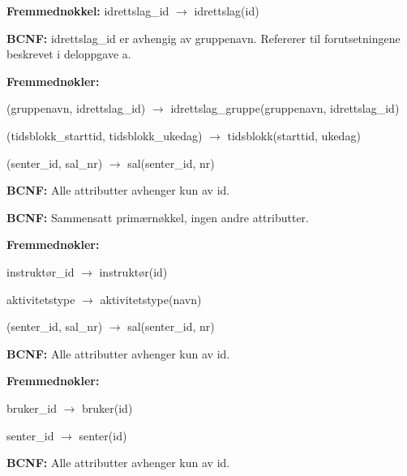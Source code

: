 \vspace{0.8em}
\textbf{Fremmednøkkel:} idrettslag\_id $\rightarrow$ idrettslag(id)\par
\vspace{0.15em}
\textbf{BCNF:} idrettslag\_id er avhengig av gruppenavn. Refererer til forutsetningene beskrevet i deloppgave a.

\vspace{0.8em}
\textbf{Fremmednøkler:}\par\vspace{-0.55em}
\begin{schemafks}
    \item (gruppenavn, idrettslag\_id) $\rightarrow$ idrettslag\_gruppe(gruppenavn, idrettslag\_id)
    \item (tidsblokk\_starttid, tidsblokk\_ukedag) $\rightarrow$ tidsblokk(starttid, ukedag)
    \item (senter\_id, sal\_nr) $\rightarrow$ sal(senter\_id, nr)
\end{schemafks}
\vspace{-0.2em}
\textbf{BCNF:} Alle attributter avhenger kun av id.

\vspace{0.8em}
\textbf{BCNF:} Sammensatt primærnøkkel, ingen andre attributter.

\vspace{0.8em}
\textbf{Fremmednøkler:}\par\vspace{-0.55em}
\begin{schemafks}
    \item instruktør\_id $\rightarrow$ instruktør(id)
    \item aktivitetstype $\rightarrow$ aktivitetstype(navn)
    \item (senter\_id, sal\_nr) $\rightarrow$ sal(senter\_id, nr)
\end{schemafks}
\vspace{-0.2em}
\textbf{BCNF:} Alle attributter avhenger kun av id.

\vspace{0.8em}
\textbf{Fremmednøkler:}\par\vspace{-0.55em}
\begin{schemafks}
    \item bruker\_id $\rightarrow$ bruker(id)
    \item senter\_id $\rightarrow$ senter(id)
\end{schemafks}
\vspace{-0.2em}
\textbf{BCNF:} Alle attributter avhenger kun av id.

